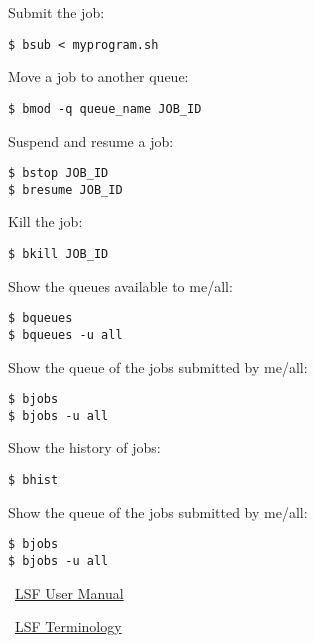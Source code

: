 \documentclass[twocolumn,8pt]{article}
\begin{document}

\begin{mdframed}[frametitle=Submitting/Moving/Killing the job]
Submit the job:
\begin{lstlisting}
$ bsub < myprogram.sh
\end{lstlisting}

Move a job to another queue:
\begin{lstlisting}
$ bmod -q queue_name JOB_ID
\end{lstlisting}

Suspend and resume a job:
\begin{lstlisting}
$ bstop JOB_ID				
$ bresume JOB_ID
\end{lstlisting}

Kill the job:
\begin{lstlisting}
$ bkill JOB_ID
\end{lstlisting}
\end{mdframed}


\begin{mdframed}[frametitle=Queues]
Show the queues available to me/all:
\begin{lstlisting}
$ bqueues
$ bqueues -u all
\end{lstlisting}

Show the queue of the jobs submitted by me/all:
\begin{lstlisting}
$ bjobs
$ bjobs -u all
\end{lstlisting}
\end{mdframed}


\begin{mdframed}[frametitle=History]
Show the history of jobs:
\begin{lstlisting}
$ bhist
\end{lstlisting}

Show the queue of the jobs submitted by me/all:
\begin{lstlisting}
$ bjobs
$ bjobs -u all
\end{lstlisting}
\end{mdframed}


\begin{mdframed}[frametitle=Resources]
\faExternalLink\ \href{https://hpc.llnl.gov/banks-jobs/running-jobs/lsf-user-manual}{LSF User Manual}

\faExternalLink\ \href{https://www.ibm.com/support/knowledgecenter/SSWRJV_10.1.0/lsf_admin/terms.html}{LSF Terminology}
\vspace{3pt}
\end{mdframed}    
\end{document}
